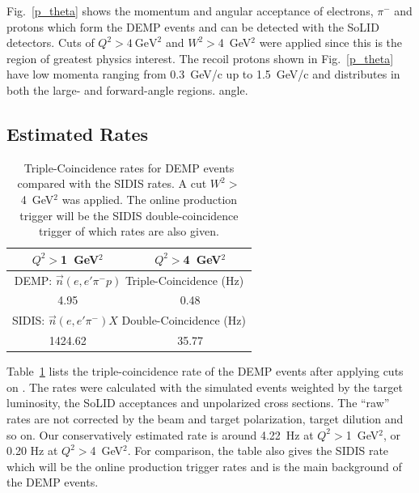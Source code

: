 Fig.~\ref{p_theta} shows the momentum and angular acceptance of electrons,
$\pi^{-}$ and protons which form the DEMP events and can be detected with the
SoLID detectors.  Cuts of $Q^{2}>4~\mathrm{GeV^{2}}$ and $W^2>$4~GeV$^2$ were applied since this is the region
of greatest physics interest.  The recoil protons shown in Fig.~\ref{p_theta} have low momenta ranging from 0.3~GeV/c up
to 1.5~GeV/c and distributes in both the large- and forward-angle regions.
angle.

\subsection{Estimated Rates
\label{sec:rates}}

\begin{table}[!ht]
\centering
\begin{tabular}{|c|c|}
 \hline
  $Q^2>$1~GeV$^2$ & $Q^2>$4~GeV$^2$\\
 \hline
\multicolumn{2}{|c|}{DEMP: $\vec{n}(e,e'\pi^{-}p)$ Triple-Coincidence (Hz)}\\
 \hline
 4.95   &  0.48 \\
 \hline
\multicolumn{2}{|c|}{SIDIS: $\vec{n}(e,e'\pi^{-})X$ Double-Coincidence (Hz)}\\
 \hline
   1424.62  & 35.77   \\
 \hline
\end{tabular}
\caption[Triple-Coincidence rates for
  neutron-DEMP]{\footnotesize{Triple-Coincidence rates for DEMP events compared
    with the SIDIS rates. A cut $W^2>$4~GeV$^2$ was applied. The online production
    trigger will be the SIDIS double-coincidence trigger of which rates are
    also given.}}
\label{rate_table}
\end{table} 

Table~\ref{rate_table} lists the triple-coincidence rate of the DEMP
events after applying cuts on . The rates were calculated with the simulated events weighted by the
target luminosity, the SoLID acceptances and unpolarized cross sections.  The
``raw'' rates are not corrected by the beam and target polarization, target
dilution and so on.  Our conservatively estimated rate is around 4.22~Hz at $Q^{2}>$1~GeV$^{2}$, or 0.20 Hz
at $Q^{2}>$4~GeV$^{2}$. For comparison, the table also gives the SIDIS rate
which will be the online production trigger rates and is the main background of
the DEMP events.

